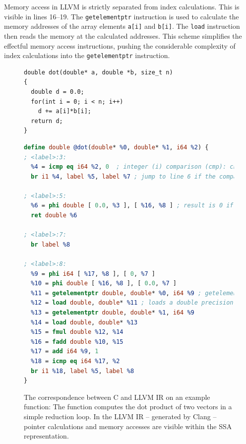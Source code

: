     Memory access in LLVM is strictly separated from index calculations.
    This is visible in lines 16--19.
    The {\tt getelementptr} instruction is used to calculate the memory
    addresses of the array elements {\tt a[i]} and {\tt b[i]}.
    The {\tt load} instruction then reads the memory at the calculated
    addresses.
    This scheme simplifies the effectful memory access instructions, pushing the
    considerable complexity of index calculations into the {\tt getelementptr}
    instruction.

\begin{figure}[p]
\vspace{-0.09cm}
\begin{lstlisting}[language=MyCpp,captionpos=t,title=
   {{\bf(a)} {} C source code of a {\tt dot} product function implementation:
    \leftskip=0pt}]
double dot(double* a, double *b, size_t n)
{
  double d = 0.0;
  for(int i = 0; i < n; i++)
    d += a[i]*b[i];
  return d;
}
\end{lstlisting}
\vspace{-0.09cm}
\begin{lstlisting}[language=LLVM,breaklines=true,captionpos=t,title=
   {{\bf(b)} {} LLVM IR representation of the same {\tt dot} product function:
    \leftskip=0pt}]
define double @dot(double* %0, double* %1, i64 %2) {
; <label>:3:
  %4 = icmp eq i64 %2, 0  ; integer (i) comparison (cmp): check if register %2 is equal (eq) to constant zero
  br i1 %4, label %5, label %7 ; jump to line 6 if the comparison held, otherwise jump to line 10 instead

; <label>:5:
  %6 = phi double [ 0.0, %3 ], [ %16, %8 ] ; result is 0 if the phi node was reached from line 4, otherwise it was reached from line 24 and the result is taken from %16
  ret double %6

; <label>:7:
  br label %8

; <label>:8:
  %9 = phi i64 [ %17, %8 ], [ 0, %7 ]
  %10 = phi double [ %16, %8 ], [ 0.0, %7 ]
  %11 = getelementptr double, double* %0, i64 %9 ; getelementpointer calculates memory addresses, here it computes the address of the %9-th value in the array %0
  %12 = load double, double* %11 ; loads a double precision floating point value from the calculated address
  %13 = getelementptr double, double* %1, i64 %9
  %14 = load double, double* %13
  %15 = fmul double %12, %14
  %16 = fadd double %10, %15
  %17 = add i64 %9, 1
  %18 = icmp eq i64 %17, %2
  br i1 %18, label %5, label %8
}
\end{lstlisting}
\caption{The correspondence between C and LLVM IR on an example function:
         The function computes the dot product of two vectors in a simple
         reduction loop.
         In the LLVM IR -- generated by Clang -- pointer calculations and memory
         accesses are visible within the SSA representation.}
\label{llvmirexample}
\end{figure}


